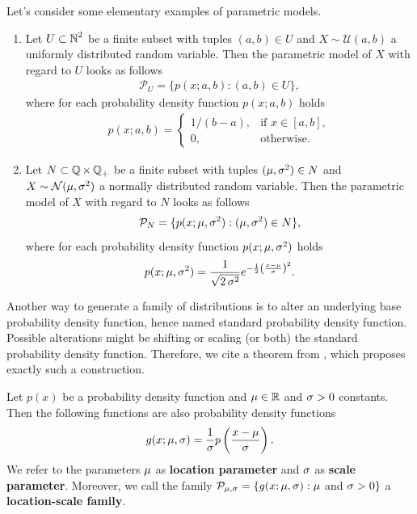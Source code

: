 \begin{example}\label{ex:parametric_model}
Let's consider some elementary examples of parametric models.
\begin{enumerate}
\item Let $U\subset \operatorname{\mathbb{N}}^2$ be a finite subset with tuples $(a,b) \in U$ and $X\sim\mathcal{U}(a, b)$ a uniformly distributed random variable. Then the parametric model of $X$ with regard to $U$ looks as follows
\begin{align*}
\mathcal{P}_U = \{p(x; a, b) : (a,b) \in U\},
\end{align*}
where for each probability density function $p(x;a,b)$ holds
\begin{align*}
p(x; a, b) =
\begin{cases}
1/(b-a), &\text{if } x\in [a, b],\\
0, &\text{otherwise}.
\end{cases}
\end{align*}
\item Let $N\subset \operatorname{\mathbb{Q}}\times \operatorname{\mathbb{Q}}_+$ be a finite subset with tuples $(\operatorname{\mu},\operatorname{\sigma}^2) \in N$ and $X\sim\mathcal{N}(\operatorname{\mu}, \operatorname{\sigma}^2)$ a normally distributed random variable. Then the parametric model of $X$ with regard to $N$ looks as follows
\begin{align*}
\mathcal{P}_N = \{p(x; \operatorname{\mu}, \operatorname{\sigma}^2) : (\operatorname{\mu},\operatorname{\sigma}^2) \in N\},
\end{align*}
where for each probability density function $p(x; \operatorname{\mu}, \operatorname{\sigma}^2)$ holds
\begin{align*}
p(x; \operatorname{\mu}, \operatorname{\sigma}^2) = \frac{1}{\sqrt{2\operatorname{\sigma}^2}} e^{-\frac{1}{2} \left( \frac{x-\operatorname{\mu}}{\operatorname{\sigma}} \right)^2}.
\end{align*}
\end{enumerate}
\end{example}

Another way to generate a family of distributions is to alter an underlying base probability density function, hence named standard probability density function. Possible alterations might be shifting or scaling (or both) the standard probability density function. Therefore, we cite a theorem from \cite[Theorem~2.1]{cinelli2021variational}, which proposes exactly such a construction.

\begin{theorem}\label{theorem:pdf_gen}
Let $p(x)$ be a probability density function and $\operatorname{\mu}\in\operatorname{\mathbb{R}}$ and $\operatorname{\sigma} > 0$ constants. Then the following functions are also probability density functions
\begin{align*}
g(x;\operatorname{\mu},\operatorname{\sigma}) = \frac{1}{\operatorname{\sigma}} p\left( \frac{x - \operatorname{\mu}}{\operatorname{\sigma}} \right).
\end{align*}
We refer to the parameters $\operatorname{\mu}$ as \textbf{location parameter} and $\operatorname{\sigma}$ as \textbf{scale parameter}. Moreover, we call the family $\mathcal{P}_{\operatorname{\mu},\operatorname{\sigma}} = \{g(x;\operatorname{\mu},\operatorname{\sigma}):\operatorname{\mu}$ and $\operatorname{\sigma} > 0\}$ a \textbf{location-scale family}.
\end{theorem}

